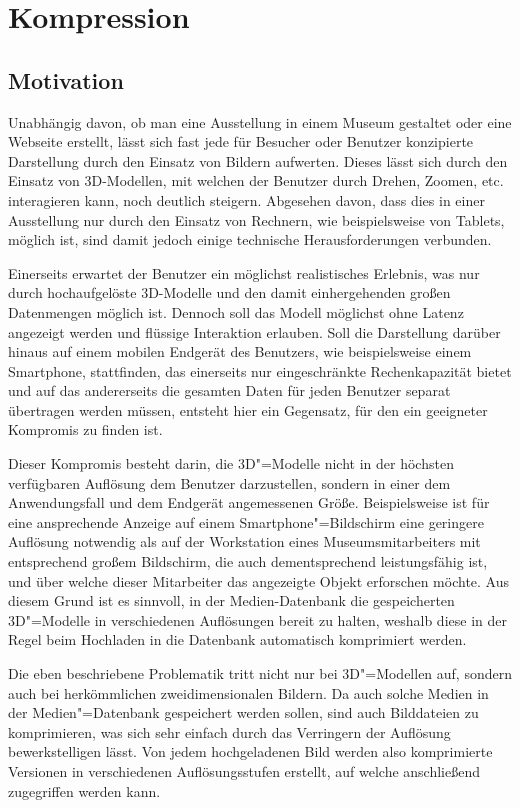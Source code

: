\section{Kompression}\label{sec:compression}

\subsection{Motivation}

Unabhängig davon, ob man eine Ausstellung in einem Museum gestaltet oder eine Webseite erstellt, lässt sich fast jede für Besucher oder Benutzer konzipierte Darstellung durch den Einsatz von Bildern aufwerten. Dieses lässt sich durch den Einsatz von 3D-Modellen, mit welchen der Benutzer durch Drehen, Zoomen, etc. interagieren kann, noch deutlich steigern. Abgesehen davon, dass dies in einer Ausstellung nur durch den Einsatz von Rechnern, wie beispielsweise von Tablets, möglich ist, sind damit jedoch einige technische Herausforderungen verbunden.

Einerseits erwartet der Benutzer ein möglichst realistisches Erlebnis, was nur durch hochaufgelöste 3D-Modelle und den damit einhergehenden großen Datenmengen möglich ist. Dennoch soll das Modell möglichst ohne Latenz angezeigt werden und flüssige Interaktion erlauben. Soll die Darstellung darüber hinaus auf einem mobilen Endgerät des Benutzers, wie beispielsweise einem Smartphone, stattfinden, das einerseits nur eingeschränkte Rechenkapazität bietet und auf das andererseits die gesamten Daten für jeden Benutzer separat übertragen werden müssen, entsteht hier ein Gegensatz, für den ein geeigneter Kompromis zu finden ist.

Dieser Kompromis besteht darin, die 3D"=Modelle nicht in der höchsten verfügbaren Auflösung dem Benutzer darzustellen, sondern in einer dem Anwendungsfall und dem Endgerät angemessenen Größe. Beispielsweise ist für eine ansprechende Anzeige auf einem Smartphone"=Bildschirm eine geringere Auflösung notwendig als auf der Workstation eines Museumsmitarbeiters mit entsprechend großem Bildschirm, die auch dementsprechend leistungsfähig ist, und über welche dieser Mitarbeiter das angezeigte Objekt erforschen möchte. Aus diesem Grund ist es sinnvoll, in der Medien-Datenbank die gespeicherten 3D"=Modelle in verschiedenen Auflösungen bereit zu halten, weshalb diese in der Regel beim Hochladen in die Datenbank automatisch komprimiert werden.

Die eben beschriebene Problematik tritt nicht nur bei 3D"=Modellen auf, sondern auch bei herkömmlichen zweidimensionalen Bildern. Da auch solche Medien in der Medien"=Datenbank gespeichert werden sollen, sind auch Bilddateien zu komprimieren, was sich sehr einfach durch das Verringern der Auflösung bewerkstelligen lässt. Von jedem hochgeladenen Bild werden also komprimierte Versionen in verschiedenen Auflösungsstufen erstellt, auf welche anschließend zugegriffen werden kann.

